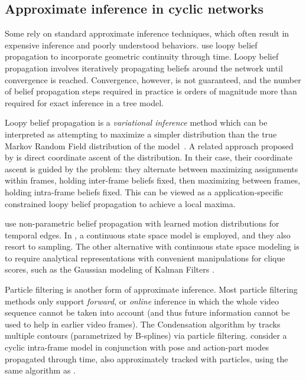 \subsection{Approximate inference in cyclic networks}
Some rely on standard approximate inference techniques, which often result in 
expensive inference and poorly understood behaviors.  \citet{ferrari08} use 
loopy belief propagation to incorporate geometric continuity through time.  
Loopy belief propagation involves iteratively propagating beliefs around the 
network until convergence is reached.  Convergence, however, is not guaranteed, 
and the number of belief propagation steps required in practice is orders of 
magnitude more than required for exact inference in a tree model.  

Loopy belief propagation is a {\em variational inference} method which can be 
interpreted as attempting to maximize a simpler distribution than the true 
Markov Random Field distribution of the model~\citep{jaakkola2000}.  A related 
approach proposed by \citet{ioffe2001} is direct coordinate ascent of the 
distribution.  In their case, their coordinate ascent is guided by the problem: 
they alternate between maximizing assignments within frames, holding 
inter-frame beliefs fixed, then maximizing between frames, holding intra-frame 
beliefs fixed.  This can be viewed as a application-specific constrained loopy 
belief propagation to achieve a local maxima.

\citet{sigal2004tracking} use non-parametric belief propagation with learned 
motion distributions for temporal edges. In \citet{sigal2004measure}, a 
continuous state space model is employed, and they also resort to sampling.  
The other alternative with continuous state space modeling is to require 
analytical representations with convenient manipulations for clique scores, 
such as the Gaussian modeling of Kalman Filters \citep{roweis1999unifying}.

Particle filtering is another form of approximate inference.  Most particle 
filtering methods only support {\em forward}, or {\em online} inference in 
which the whole video sequence cannot be taken into account (and thus future 
information cannot be used to help in earlier video frames).  The Condensation 
algorithm by \citet{isard98} tracks multiple contours (parametrized by 
B-splines) via particle filtering.  \citet{nevatia2011} consider a cyclic 
intra-frame model in conjunction with pose and action-part modes propagated 
through time, also approximately tracked with particles, using the same 
algorithm as \citet{sigal2004measure}.

